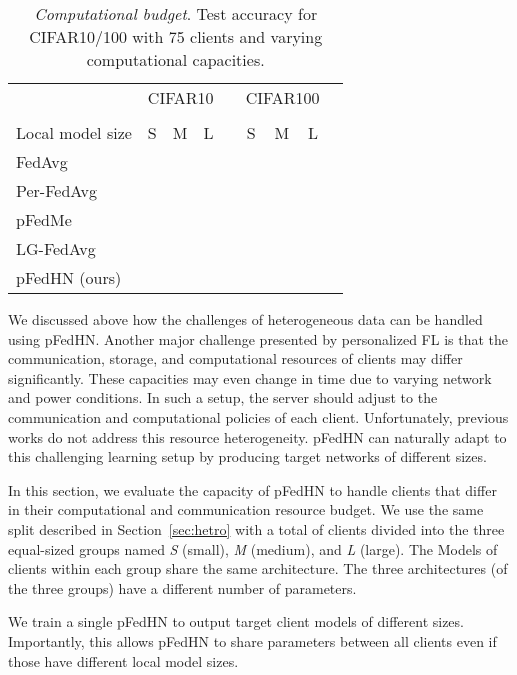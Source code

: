 \documentclass{article}
\newcommand\ourmethod{pFedHN}
\begin{document}
\begin{table*}[t]
    \small
\centering
    \caption{\textit{Computational budget}. Test accuracy for CIFAR10/100 with 75 clients and varying computational capacities.}
    \vskip 0.11in
    \begin{tabular}{l c c c c c c c c}
    \toprule
    & \multicolumn{3}{c}{CIFAR10} && \multicolumn{3}{c}{CIFAR100} \\
     \cmidrule{2-4} \cmidrule{6-8}\\
    Local model size & S  & M & L && S  & M & L\\
    \midrule
    FedAvg &  &  &  &&  &  & \\
    Per-FedAvg &  &  &  &&  &  &  \\
    pFedMe &  &  &    &&  &  &  \\
    LG-FedAvg &  &  &  &&  &  & \\
    \midrule
    \ourmethod{} (ours) &  &  &  &&  &  & \\
\bottomrule
    \end{tabular}
    \label{tab:comp}
\end{table*}



We discussed above how the challenges of heterogeneous data can be handled using \ourmethod{}. Another major challenge presented by personalized FL is that the communication, storage, and computational resources of clients may differ significantly. These capacities may even change in time due to varying network and power conditions.
In such a setup, the server should adjust to the communication and computational policies of each client. Unfortunately, previous works do not address this resource heterogeneity. \ourmethod{} can naturally adapt to this challenging learning setup by producing target networks of different sizes. 

In this section, we evaluate the capacity of \ourmethod{} to handle clients that differ in their computational and communication resource budget. We use the same split described in Section~\ref{sec:hetro} with a total of  clients divided into the three equal-sized groups named \textit{S} (small), \textit{M} (medium), and \textit{L} (large). The Models of clients within each group share the same architecture. The three architectures (of the three groups) have a different number of parameters. 

We train a single \ourmethod{} to output target client models of different sizes. Importantly, this allows \ourmethod{} to share parameters between all clients even if those have different local model sizes. 
\end{document}
